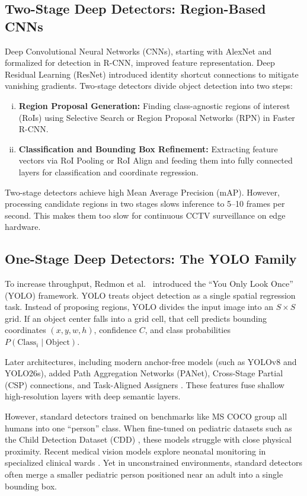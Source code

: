 \subsection{Two-Stage Deep Detectors: Region-Based CNNs}
Deep Convolutional Neural Networks (CNNs), starting with AlexNet and formalized for detection in R-CNN, improved feature representation. Deep Residual Learning (ResNet) \cite{he2016resnet} introduced identity shortcut connections to mitigate vanishing gradients. Two-stage detectors divide object detection into two steps:
\begin{enumerate}[(i)]
    \item \textbf{Region Proposal Generation:} Finding class-agnostic regions of interest (RoIs) using Selective Search or Region Proposal Networks (RPN) in Faster R-CNN.
    \item \textbf{Classification and Bounding Box Refinement:} Extracting feature vectors via RoI Pooling or RoI Align and feeding them into fully connected layers for classification and coordinate regression.
\end{enumerate}

Two-stage detectors achieve high Mean Average Precision (mAP). However, processing candidate regions in two stages slows inference to 5--10 frames per second. This makes them too slow for continuous CCTV surveillance on edge hardware.

\subsection{One-Stage Deep Detectors: The YOLO Family}
To increase throughput, Redmon et al.\ \cite{redmon2016yolo} introduced the ``You Only Look Once'' (YOLO) framework. YOLO treats object detection as a single spatial regression task. Instead of proposing regions, YOLO divides the input image into an $S \times S$ grid. If an object center falls into a grid cell, that cell predicts bounding coordinates $(x, y, w, h)$, confidence $C$, and class probabilities $P(\text{Class}_i \mid \text{Object})$.

Later architectures, including modern anchor-free models (such as YOLOv8 and YOLO26s), added Path Aggregation Networks (PANet), Cross-Stage Partial (CSP) connections, and Task-Aligned Assigners \cite{jiang2022, jocher2023ultralytics}. These features fuse shallow high-resolution layers with deep semantic layers.

However, standard detectors trained on benchmarks like MS COCO group all humans into one ``person'' class. When fine-tuned on pediatric datasets such as the Child Detection Dataset (CDD) \cite{diop2025}, these models struggle with close physical proximity. Recent medical vision models explore neonatal monitoring in specialized clinical wards \cite{diop2024}. Yet in unconstrained environments, standard detectors often merge a smaller pediatric person positioned near an adult into a single bounding box.

